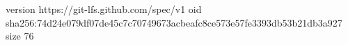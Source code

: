 version https://git-lfs.github.com/spec/v1
oid sha256:74d24e079df07de45c7c70749673acbeafc8ce573e57fe3393db53b21db3a927
size 76
